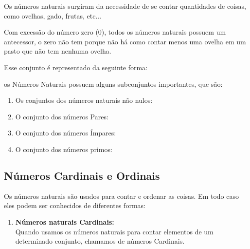 \begin{multicols*}{2}
	Os números naturais surgiram da necessidade de se contar quantidades de coisas, como ovelhas, gado, frutas, etc...
	
	Com excessão do número zero (0), todos os números naturais possuem um antecessor, o zero não tem porque não há como contar menos uma ovelha em um pasto que não tem nenhuma ovelha.
	
	Esse conjunto é representado da seguinte forma:
	
	
	os Números Naturais possuem alguns subconjuntos importantes, que são:
	
	\begin{enumerate}
	
		\item Os conjuntos dos números naturais não nulos:
		
		
		\item O conjunto dos números Pares:
								
		
		\item O conjunto dos números Ímpares:
		
		
		\item O conjunto dos números primos:
		
		
	\end{enumerate}
		
		\subsection{Números Cardinais e Ordinais}
		
		Os números naturais são usados para contar e ordenar as coisas. Em todo caso eles podem ser conhecidos de diferentes formas:

		\begin{enumerate}
		
		\item \textbf{Números naturais Cardinais:}\\
		
		Quando usamos os números naturais para contar elementos de um determinado conjunto, chamamos de números Cardinais.
		

\end{enumerate}
\end{multicols*}
